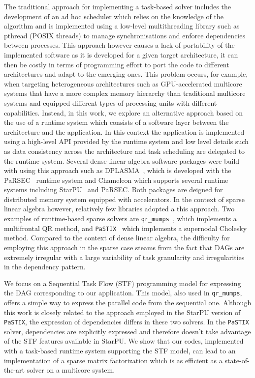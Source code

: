 \documentclass{article}
\newcommand{\starpu}{{StarPU}\xspace}
\newcommand{\parsec}{{PaRSEC}\xspace}
\newcommand{\qrm}{\texttt{qr\_mumps}\xspace}
\newcommand{\pastix}{\texttt{PaSTIX}\xspace}
\begin{document}
The traditional approach for implementing a task-based solver includes
the development of an ad hoc scheduler which relies on the knowledge
of the algorithm and is implemented using a low-level multithreading
library such as pthread (POSIX threads) to manage synchronisations and
enforce dependencies between processes. This approach however causes a
lack of portability of the implemented software as it is developed for
a given target architecture, it can then be costly in terms of
programming effort to port the code to different architectures and
adapt to the emerging ones. This problem occurs, for example, when
targeting heterogeneous architectures such as GPU-accelerated
multicore systems that have a more complex memory hierarchy than
traditional multicore systems and equipped different types of
processing units with different capabilities. Instead, in this work,
we explore an alternative approach based on the use of a runtime
system which consists of a software layer between the architecture and
the application. In this context the application is implemented using
a high-level API provided by the runtime system and low level details
such as data consistency across the architecture and task scheduling
are delegated to the runtime system. Several dense linear algebra
software packages were build with using this approach such as
DPLASMA~\cite{b.b.d.f.ea:11}, which is developed with the
\parsec~\cite{b.b.d.f.ea:13} runtime system and Chameleon which
supports several runtime systems including \starpu~\cite{a.t.n.w:11}
and \parsec. Both packages are deigned for distributed memory system
equipped with accelerators. In the context of sparse linear algebra
however, relatively few libraries adopted a this approach. Two
examples of runtime-based sparse solvers are \qrm~\cite{a.b.g.l.:14},
which implements a multifrontal QR method, and \pastix~\cite{h.r.r:02}
which implements a supernodal Cholesky method. Compared to the context
of dense linear algebra, the difficulty for employing this approach in
the sparse case steams from the fact that DAGs are extremely irregular
with a large variability of task granularity and irregularities in the
dependency pattern.

We focus on a Sequential Task Flow (STF) programming model for
expressing the DAG corresponding to our application. This model, also
used in \qrm, offers a simple way to express the parallel code from
the sequential one. Although this work is closely related to the
approach employed in the \starpu version of \pastix, the expression of
dependencies differs in these two solvers. In the \pastix solver,
dependencies are explicitly expressed and therefore doesn't take
advantage of the STF features available in \starpu. We show that our
codes, implemented with a task-based runtime system supporting the STF
model, can lead to an implementation of a sparse matrix factorization
which is as efficient as a state-of-the-art solver on a multicore
system.
\end{document}
